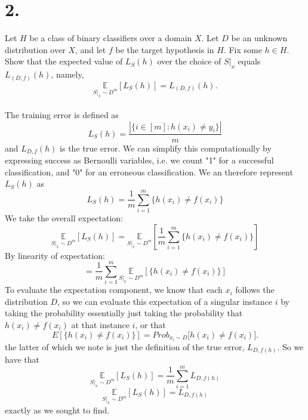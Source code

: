 \documentclass{article}
\begin{document}
{\Large 

\section*{2.}
Let \(H\) be a class of binary classifiers over a domain \(X\). Let \(D\) be an unknown distribution over \(X\), and let \(f\) be the target hypothesis in \(H\). Fix some \(h \in H\). Show that the expected value of \(L_S(h)\) over the choice of \(S|_x\) equals \(L_{(D,f)}(h)\), namely,
\[
  \underset{S|_x \sim D^m}{\mathbb{E}} [L_S(h)] = L_{(D,f)}(h).
\]
\\
The training error is defined as 
\[
  L_S(h) = \frac{|\{ i \in [m] : h(x_i) \neq y_i \}|}{m}
\]
and \(L_{D, f} (h)\) is the true error. We can simplify this computationally by expressing success as Bernoulli variables, i.e. we count "1" for a successful classification, and "0" for an erroneous classification. We an therefore represent \(L_S(h)\) as \[
  L_S(h) = \frac{1}{m} \sum_{i=1}^{m} \{ h(x_i) \neq f(x_i) \} 
\]
We take the overall expectation:
\[
  \underset{S|_x \sim D^m}{\mathbb{E}} [L_S(h)] = \underset{S|_x \sim D^m}{\mathbb{E}} [ \frac{1}{m} \sum_{i=1}^{m} \{ h(x_i) \neq f(x_i) \} ]
\]
By linearity of expectation:
\[
  = \frac{1}{m} \sum_{i=1}^{m} \underset{S|_x \sim D^m}{\mathbb{E}} [\{ h(x_i) \neq f(x_i) \} ]
\]
To evaluate the expectation component, we know that each \(x_i\) follows the distribution \(D\), so we can evaluate this expectation of a singular instance \(i\) by taking the probability essentially just taking the probability that \( h(x_i) \neq f(x_i)\) at that instance \(i\), or that
\[ 
  E \left[ \{h(x_i)\neq f(x_i)\} \right] = Prob_{x_i\sim D}\bigl[h(x_i)\neq f(x_i)\bigr]. 
\]
the latter of which we note is just the definition of the true error, \(L_{D, f(h)}\). So we have that 
\[
  \underset{S|_x \sim D^m}{\mathbb{E}} [L_S(h)] = \frac{1}{m} \sum_{i=1}^{m} L_{D, f(h)}
\]
\[
  \boxed{\underset{S|_x \sim D^m}{\mathbb{E}} [L_S(h)] = L_{D, f(h)}}
\]
exactly as we sought to find.

}
\end{document}
